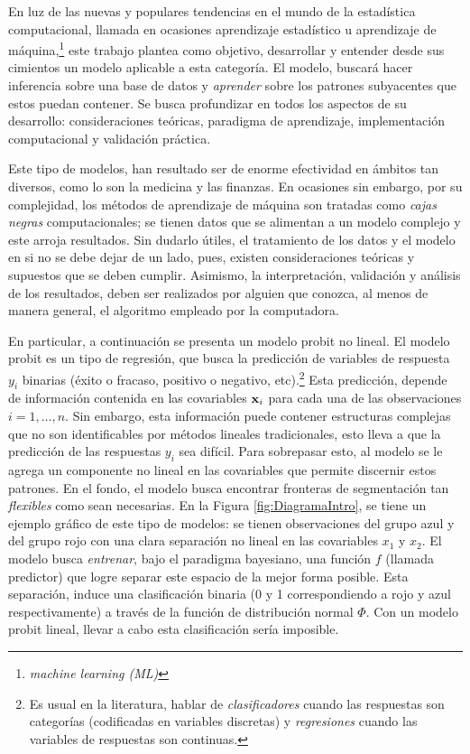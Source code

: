 \documentclass[../Main/Main.tex]{subfiles}
\begin{document}
En luz de las nuevas y populares tendencias en el mundo de la estadística computacional, llamada en ocasiones aprendizaje estadístico u aprendizaje de máquina,\footnote{\textit{machine learning (ML)}} este trabajo plantea como objetivo, desarrollar y entender desde sus cimientos un modelo aplicable a esta categoría. El modelo, buscará hacer inferencia sobre una base de datos y \textit{aprender} sobre los patrones subyacentes que estos puedan contener. Se busca profundizar en todos los aspectos de su desarrollo: consideraciones teóricas, paradigma de aprendizaje, implementación computacional y validación práctica. 

Este tipo de modelos, han resultado ser de enorme efectividad en  ámbitos tan diversos, como lo son la medicina y las finanzas. En ocasiones sin embargo, por su complejidad, los métodos de aprendizaje de máquina son tratadas como \textit{cajas negras} computacionales; se tienen datos que se alimentan a un modelo complejo y este arroja resultados. Sin dudarlo útiles, el tratamiento de los datos y el modelo en si no se debe dejar de un lado, pues, existen consideraciones teóricas y supuestos que se deben cumplir. Asimismo, la interpretación, validación y análisis de los resultados, deben ser realizados por alguien que conozca, al menos de manera general, el algoritmo empleado por la computadora.

En particular, a continuación se presenta un modelo probit no lineal. El modelo probit es un tipo de regresión, que busca la predicción de variables de respuesta $y_i$ binarias (éxito o fracaso, positivo o negativo, etc).\footnote{Es usual en la literatura, hablar de \textit{clasificadores} cuando las respuestas son categorías (codificadas en variables discretas) y \textit{regresiones} cuando las variables de respuestas son continuas.} Esta predicción, depende de información contenida en las covariables $\mathbf{x}_i$ para cada una de las observaciones $i = 1,\ldots,n$. Sin embargo, esta información puede contener estructuras complejas que no son identificables por métodos lineales tradicionales, esto lleva a que la predicción de las respuestas $y_i$ sea difícil. Para sobrepasar esto, al modelo se le agrega un componente no lineal en las covariables que permite discernir estos patrones. En el fondo, el modelo busca encontrar fronteras de segmentación tan \textit{flexibles} como sean necesarias. En la Figura \ref{fig:DiagramaIntro}, se tiene un ejemplo gráfico de este tipo de modelos: se tienen observaciones del grupo azul y del grupo rojo con una clara separación no lineal en las covariables $x_1$ y $x_2$. El modelo busca \textit{entrenar}, bajo el paradigma bayesiano, una función $f$ (llamada predictor) que logre separar este espacio de la mejor forma posible. Esta separación, induce una clasificación binaria (0 y 1 correspondiendo a rojo y azul respectivamente) a través de la función de distribución normal $\Phi$. Con un modelo probit lineal, llevar a cabo esta clasificación sería imposible. 
\end{document}

